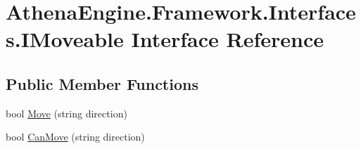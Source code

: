 \hypertarget{interface_athena_engine_1_1_framework_1_1_interfaces_1_1_i_moveable}{\section{Athena\-Engine.\-Framework.\-Interfaces.\-I\-Moveable Interface Reference}
\label{interface_athena_engine_1_1_framework_1_1_interfaces_1_1_i_moveable}
}
\subsection*{Public Member Functions}
\begin{DoxyCompactItemize}
\item 
bool \hyperlink{interface_athena_engine_1_1_framework_1_1_interfaces_1_1_i_moveable_a08ca3e5e3ff6dca9f2f273cbb6c64146}{Move} (string direction)
\item 
bool \hyperlink{interface_athena_engine_1_1_framework_1_1_interfaces_1_1_i_moveable_a2e5a5bf22e29e7781b639d45633fbce0}{Can\-Move} (string direction)
\end{DoxyCompactItemize}


